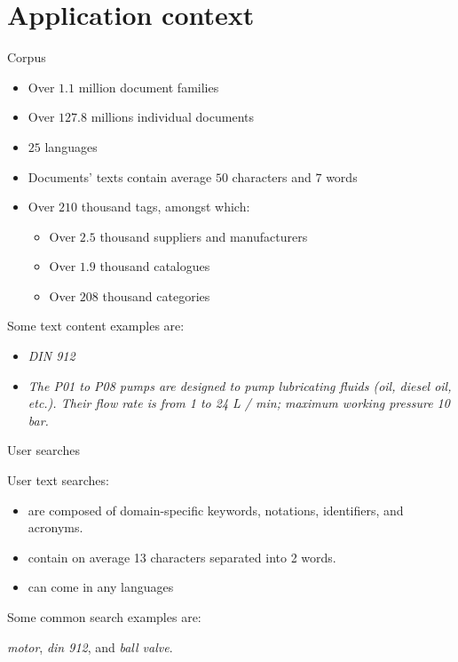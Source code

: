 \section{Application context}

\begin{frame}{Corpus}
    
    \begin{itemize}
        \item Over $1.1$ million document families
        \item Over $127.8$ millions individual documents
        \item $25$ languages
        \item Documents' texts contain average $50$ characters and $7$ words
        \item Over $210$ thousand tags, amongst which:
        \begin{itemize}
            \item Over $2.5$ thousand suppliers and manufacturers
            \item Over $1.9$ thousand catalogues
            \item Over $208$ thousand categories
        \end{itemize}
    \end{itemize}

    Some text content examples are:
    \begin{itemize}
        \item \emph{DIN 912}
        \item \emph{The P01 to P08 pumps are designed to pump lubricating fluids (oil, diesel oil, etc.). Their flow rate is from 1 to 24 L / min; maximum working pressure 10 bar.} 
    \end{itemize}

\end{frame}

\begin{frame}{User searches}
    
    User text searches:
    \begin{itemize}
        \item are composed of domain-specific keywords, notations, identifiers, and
        acronyms.
        \item contain on average 13 characters separated into 2 words.
        \item can come in any languages
    \end{itemize}

    Some common search examples are:
    \begin{center}
        \emph{motor}, \emph{din 912}, and \emph{ball valve}.
    \end{center}
    
\end{frame}


